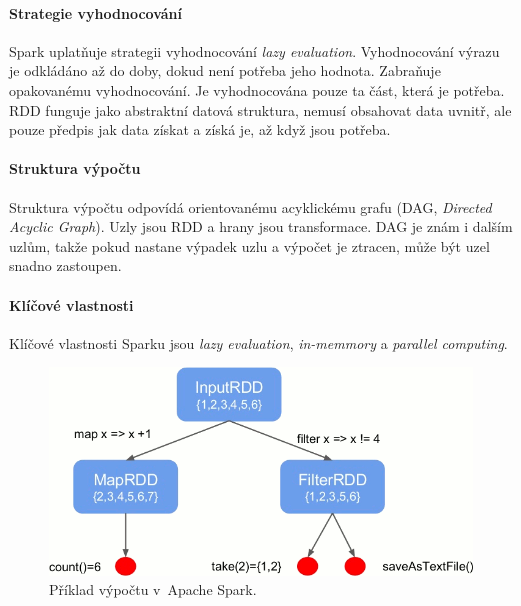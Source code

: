 \paragraph*{Strategie vyhodnocování} Spark uplatňuje strategii vyhodnocování \textit{lazy evaluation}. Vyhodnocování výrazu je odkládáno až do doby, dokud není potřeba jeho hodnota. Zabraňuje opakovanému vyhodnocování. Je vyhodnocována pouze ta část, která je potřeba. RDD funguje jako abstraktní datová struktura, nemusí obsahovat data uvnitř, ale pouze předpis jak data získat a získá je, až když jsou potřeba.

\paragraph*{Struktura výpočtu} Struktura výpočtu odpovídá orientovanému acyklickému grafu (DAG, \textit{Directed Acyclic Graph}). Uzly jsou RDD a hrany jsou transformace. DAG je znám i dalším uzlům, takže pokud nastane výpadek uzlu a výpočet je ztracen, může být uzel snadno zastoupen.

\paragraph*{Klíčové vlastnosti} Klíčové vlastnosti Sparku jsou \textit{lazy evaluation}, \textit{in-memmory} a \textit{parallel computing}.

\begin{figure}[H]
    \centering
    \includegraphics[width=0.85\linewidth]{spark_example.png}
    \caption{Příklad výpočtu v~Apache Spark.}
\end{figure}

